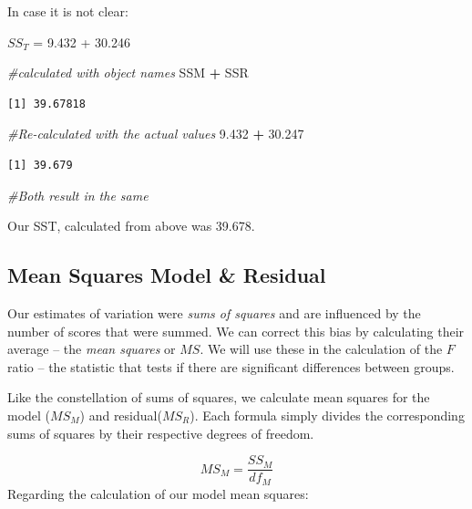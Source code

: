 \documentclass[
  11pt,
]{book}
\newenvironment{Shaded}{\begin{snugshade}}{\end{snugshade}}
\newcommand{\CommentTok}[1]{\textcolor[rgb]{0.37,0.37,0.37}{\textit{#1}}}
\newcommand{\FloatTok}[1]{\textcolor[rgb]{0.06,0.06,0.06}{#1}}
\newcommand{\NormalTok}[1]{#1}
\newcommand{\SpecialCharTok}[1]{\textcolor[rgb]{0.43,0.43,0.43}{\textbf{#1}}}
\begin{document}
In case it is not clear:

\(SS_T\) = 9.432 + 30.246

\begin{Shaded}
\begin{Highlighting}[]
\CommentTok{\#calculated with object names }
\NormalTok{SSM }\SpecialCharTok{+}\NormalTok{ SSR}
\end{Highlighting}
\end{Shaded}

\begin{verbatim}
[1] 39.67818
\end{verbatim}

\begin{Shaded}
\begin{Highlighting}[]
\CommentTok{\#Re{-}calculated with the actual values}
\FloatTok{9.432} \SpecialCharTok{+} \FloatTok{30.247}
\end{Highlighting}
\end{Shaded}

\begin{verbatim}
[1] 39.679
\end{verbatim}

\begin{Shaded}
\begin{Highlighting}[]
\CommentTok{\#Both result in the same}
\end{Highlighting}
\end{Shaded}

Our SST, calculated from above was 39.678.

\hypertarget{mean-squares-model-residual}{%
\subsection{Mean Squares Model \& Residual}\label{mean-squares-model-residual}}

Our estimates of variation were \emph{sums of squares} and are influenced by the number of scores that were summed. We can correct this bias by calculating their average -- the \emph{mean squares} or \(MS\). We will use these in the calculation of the \(F\) ratio -- the statistic that tests if there are significant differences between groups.

Like the constellation of sums of squares, we calculate mean squares for the model (\(MS_M\)) and residual(\(MS_R\)). Each formula simply divides the corresponding sums of squares by their respective degrees of freedom.

\[MS_M = \frac{SS_{M}}{df{_{M}}}\] Regarding the calculation of our model mean squares:
\end{document}
